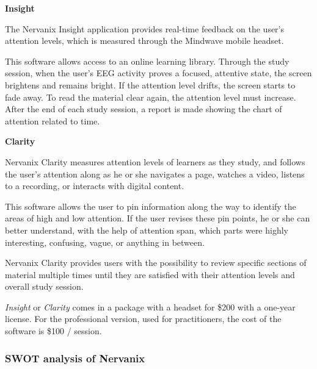 \documentclass[letterpaper,10pt]{article}
\begin{document}
\textbf{Insight}

The Nervanix Insight application provides real-time feedback on the user’s attention levels, which is measured through the Mindwave mobile headset.
 
This software allows access to an online learning library. Through the study session, when the user’s EEG activity proves a focused, attentive state, the screen brightens and remains bright. If the attention level drifts, the screen starts to fade away. To read the material clear again, the attention level must increase. After the end of each study session, a report is made showing the chart of attention related to time.

\textbf{Clarity}


Nervanix Clarity measures attention levels of learners as they study, and follows the user’s attention along as he or she navigates a page, watches a video, listens to a recording, or interacts with digital content.

This software allows the user to pin information along the way to identify the areas of high and low attention. If the user revises these pin points, he or she can better understand, with the help of attention span, which parts were highly interesting, confusing, vague, or anything in between.
 
Nervanix Clarity provides users with the possibility to review specific sections of material multiple times until they are satisfied with their attention levels and overall study session.

\textit{Insight} or \textit{Clarity} comes in a package with a headset for \$200 with a one-year license. For the professional version, used for practitioners, the cost of the software is \$100 / session.


\cite{nervanix}


\subsubsection{SWOT analysis of Nervanix}
\end{document}
